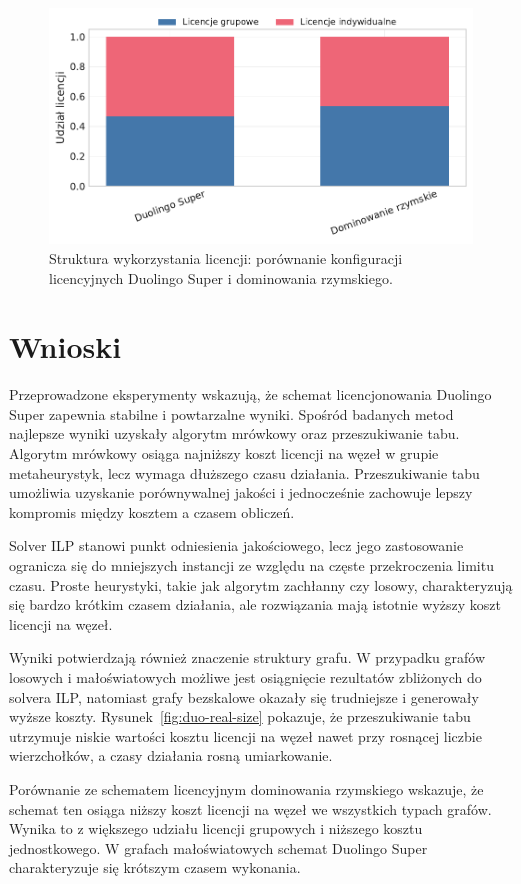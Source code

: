 \begin{figure}[H]
  \centering
  \includegraphics[width=0.6\linewidth]{assets/figures/benchmark/synthetic/license_mix_duo_vs_roman.pdf}
  \caption{Struktura wykorzystania licencji: porównanie konfiguracji licencyjnych Duolingo Super i dominowania rzymskiego.}
  \label{fig:duo-roman-license}
\end{figure}

\section{Wnioski}

Przeprowadzone eksperymenty wskazują, że schemat licencjonowania Duolingo Super zapewnia stabilne i powtarzalne wyniki. Spośród badanych metod najlepsze wyniki uzyskały algorytm mrówkowy oraz przeszukiwanie tabu. Algorytm mrówkowy osiąga najniższy koszt licencji na węzeł w grupie metaheurystyk, lecz wymaga dłuższego czasu działania. Przeszukiwanie tabu umożliwia uzyskanie porównywalnej jakości i jednocześnie zachowuje lepszy kompromis między kosztem a czasem obliczeń.

Solver ILP stanowi punkt odniesienia jakościowego, lecz jego zastosowanie ogranicza się do mniejszych instancji ze względu na częste przekroczenia limitu czasu. Proste heurystyki, takie jak algorytm zachłanny czy losowy, charakteryzują się bardzo krótkim czasem działania, ale rozwiązania mają istotnie wyższy koszt licencji na węzeł.

Wyniki potwierdzają również znaczenie struktury grafu. W przypadku grafów losowych i małoświatowych możliwe jest osiągnięcie rezultatów zbliżonych do solvera ILP, natomiast grafy bezskalowe okazały się trudniejsze i generowały wyższe koszty. Rysunek~\ref{fig:duo-real-size} pokazuje, że przeszukiwanie tabu utrzymuje niskie wartości kosztu licencji na węzeł nawet przy rosnącej liczbie wierzchołków, a czasy działania rosną umiarkowanie.

Porównanie ze schematem licencyjnym dominowania rzymskiego wskazuje, że schemat ten osiąga niższy koszt licencji na węzeł we wszystkich typach grafów. Wynika to z większego udziału licencji grupowych i niższego kosztu jednostkowego. W grafach małoświatowych schemat Duolingo Super charakteryzuje się krótszym czasem wykonania.

